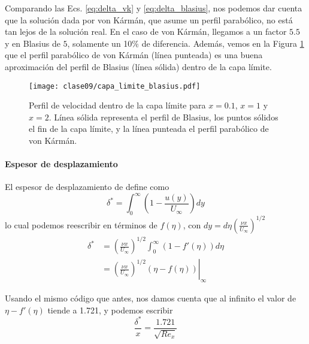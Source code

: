 Comparando las Ecs. \eqref{eq:delta_vk} y \eqref{eq:delta_blasius}, nos podemos dar cuenta que la solución dada por von Kármán, que asume un perfil parabólico, no está tan lejos de la solución real.
En el caso de von Kármán, llegamos a un factor $5.5$ y en Blasius de $5$, solamente un 10\% de diferencia.
Además, vemos en la Figura \ref{fig:capa_limite_blasius} que el perfil parabólico de von Kármán (línea punteada) es una buena aproximación del perfil de Blasius (línea sólida) dentro de la capa límite.
%
\begin{figure}
\centering
\texttt{[image: clase09/capa\_limite\_blasius.pdf]}
\caption{Perfil de velocidad dentro de la capa límite para $x=0.1$, $x=1$ y $x=2$. Línea sólida representa el perfil de Blasius, los puntos sólidos el fin de la capa límite, y la línea punteada el perfil parabólico de von Kármán.}
\label{fig:capa_limite_blasius}
\end{figure}

\paragraph*{Espesor de desplazamiento}

El espesor de desplazamiento de define como 
%
\begin{equation}
\delta^* = \int_0^\infty\left(1-\frac{u(y)}{U_\infty}\right)dy
\end{equation}
%
lo cual podemos reescribir en términos de $f(\eta)$, con $dy = d\eta\left(\frac{\nu x}{U_\infty}\right)^{1/2}$
%
\begin{align}
\delta^* &= \left(\frac{\nu x}{U_\infty}\right)^{1/2}\int_0^\infty(1-f'(\eta))d\eta\\
& = \left.\left(\frac{\nu x}{U_\infty}\right)^{1/2} (\eta-f(\eta))\right|_\infty
\end{align}

Usando el mismo código que antes, nos damos cuenta que al infinito el valor de $\eta-f'(\eta)$ tiende a 1.721, y podemos escribir
%
\begin{equation}
\frac{\delta^*}{x} = \frac{1.721}{\sqrt{Re_x}}
\end{equation}

